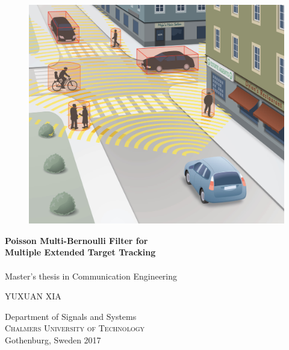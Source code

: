 
\begin{titlepage}
			
\addtolength{\voffset}{2cm}

\begin{figure}[H]
\centering
\vspace{2cm}	%
\includegraphics[width=0.7\linewidth]{figure/cover}
\end{figure}

\mbox{}
\vfill
\renewcommand{\familydefault}{\sfdefault} \normalfont %
\textbf{{\Huge 	Poisson Multi-Bernoulli Filter for	\\[0.2cm] 
				Multiple Extended Target Tracking }} 	\\[0.5cm]
{\Large }\\[0.5cm]
Master's thesis in Communication Engineering \setlength{\parskip}{1cm}

{\Large YUXUAN XIA} \setlength{\parskip}{2.9cm}

Department of Signals and Systems \\
\textsc{Chalmers University of Technology} \\
Gothenburg, Sweden 2017

\renewcommand{\familydefault}{\rmdefault} \normalfont %
\end{titlepage}


\newpage
\restoregeometry
\thispagestyle{empty}
\mbox{}


